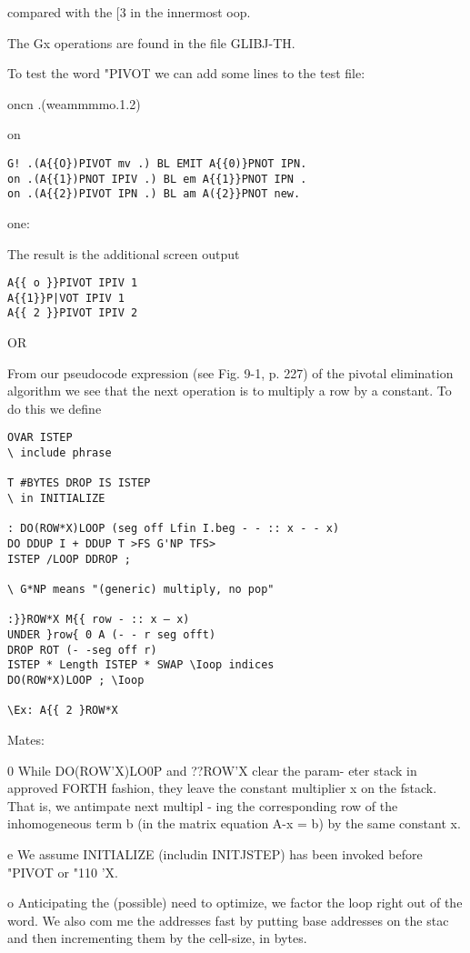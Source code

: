 {{{{{{{{{compared with the [3 in the innermost oop.

The Gx operations are found in the file GLIBJ-TH.

To test the word "PIVOT we can add some lines to the test file:

oncn .(weammmmo.1.2)

on

\begin{verbatim}
G! .(A{{O})PIVOT mv .) BL EMIT A{{0)}PNOT IPN.
on .(A{{1})PNOT IPIV .) BL em A{{1}}PNOT IPN .
on .(A{{2})PIVOT IPN .) BL am A({2}}PNOT new.
\end{verbatim}
one:


The result is the additional screen output

\begin{verbatim}
A{{ o }}PIVOT IPIV 1
A{{1}}P|VOT IPIV 1
A{{ 2 }}PIVOT IPIV 2
\end{verbatim}
OR

From our pseudocode expression (see Fig. 9-1, p. 227) of the
pivotal elimination algorithm we see that the next operation is to
multiply a row by a constant. To do this we define

\begin{verbatim}
OVAR ISTEP
\ include phrase

T #BYTES DROP IS ISTEP
\ in INITIALIZE

: DO(ROW*X)LOOP (seg off Lfin I.beg - - :: x - - x)
DO DDUP I + DDUP T >FS G'NP TFS>
ISTEP /LOOP DDROP ;

\ G*NP means "(generic) multiply, no pop"

:}}ROW*X M{{ row - :: x — x)
UNDER }row{ 0 A (- - r seg offt)
DROP ROT (- -seg off r)
ISTEP * Length ISTEP * SWAP \Ioop indices
DO(ROW*X)LOOP ; \Ioop

\Ex: A{{ 2 }ROW*X

\end{verbatim}
Mates:

0 While DO(ROW'X)LO0P and ??ROW'X clear the param-
eter stack in approved FORTH fashion, they leave the constant
multiplier x on the fstack. That is, we antimpate next multipl -
ing the corresponding row of the inhomogeneous term b (in
the matrix equation A-x = b) by the same constant x.

e We assume INITIALIZE (includin INITJSTEP) has been
invoked before "PIVOT or "110 'X.

o Anticipating the (possible) need to optimize, we factor the loop
right out of the word. We also com me the addresses fast by
putting base addresses on the stac and then incrementing
them by the cell-size, in bytes.

}}}}}}}}}
